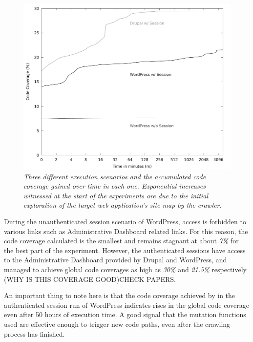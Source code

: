 \begin{figure}[!htb]
  \centering \includegraphics[width=\linewidth]{figures/plot_coverage.pdf}
  \captionsetup{justification=centering}
  \caption[Accumulated Global Code Coverage using \pname{}]{\textit{Three different execution scenarios and the accumulated code coverage gained over time in each one. Exponential increases witnessed at the start of the experiments are due to the initial exploration of the target web application's site map by the crawler.}} 
  \label{fig:plot_coverage}
\end{figure}

During the unauthenticated session scenario of WordPress, access is forbidden to various links such as Administrative Dashboard related links. For this reason, the code coverage calculated is the smallest and remains stagnant at about \emph{7\%} for the best part of the experiment. However, the authenticated sessions have access to the Administrative Dashboard provided by Drupal and WordPress, and managed to achieve global code coverages as high as \emph{30\%} and \emph{21.5\%} respectively (WHY IS THIS COVERAGE GOOD)CHECK PAPERS. 

An important thing to note here is that the code coverage achieved by \pname{} in the authenticated session run of WordPress indicates rises in the global code coverage even after 50 hours of execution time. A good signal that the mutation functions used are effective enough to trigger new code paths, even after the crawling process has finished.
 
